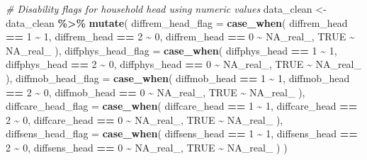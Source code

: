 \documentclass[
]{article}
\newenvironment{Shaded}{\begin{snugshade}}{\end{snugshade}}
\newcommand{\AttributeTok}[1]{\textcolor[rgb]{0.13,0.29,0.53}{#1}}
\newcommand{\CommentTok}[1]{\textcolor[rgb]{0.56,0.35,0.01}{\textit{#1}}}
\newcommand{\ConstantTok}[1]{\textcolor[rgb]{0.56,0.35,0.01}{#1}}
\newcommand{\DecValTok}[1]{\textcolor[rgb]{0.00,0.00,0.81}{#1}}
\newcommand{\FunctionTok}[1]{\textcolor[rgb]{0.13,0.29,0.53}{\textbf{#1}}}
\newcommand{\NormalTok}[1]{#1}
\newcommand{\OtherTok}[1]{\textcolor[rgb]{0.56,0.35,0.01}{#1}}
\newcommand{\SpecialCharTok}[1]{\textcolor[rgb]{0.81,0.36,0.00}{\textbf{#1}}}
\begin{document}
\begin{Shaded}
\begin{Highlighting}[]
\CommentTok{\# Disability flags for household head using numeric values}
\NormalTok{data\_clean }\OtherTok{\textless{}{-}}\NormalTok{ data\_clean }\SpecialCharTok{\%\textgreater{}\%}
  \FunctionTok{mutate}\NormalTok{(}
    \AttributeTok{diffrem\_head\_flag =} \FunctionTok{case\_when}\NormalTok{(}
\NormalTok{      diffrem\_head }\SpecialCharTok{==} \DecValTok{1} \SpecialCharTok{\textasciitilde{}} \DecValTok{1}\NormalTok{,}
\NormalTok{      diffrem\_head }\SpecialCharTok{==} \DecValTok{2} \SpecialCharTok{\textasciitilde{}} \DecValTok{0}\NormalTok{,}
\NormalTok{      diffrem\_head }\SpecialCharTok{==} \DecValTok{0} \SpecialCharTok{\textasciitilde{}} \ConstantTok{NA\_real\_}\NormalTok{,}
      \ConstantTok{TRUE} \SpecialCharTok{\textasciitilde{}} \ConstantTok{NA\_real\_}
\NormalTok{    ),}
    \AttributeTok{diffphys\_head\_flag =} \FunctionTok{case\_when}\NormalTok{(}
\NormalTok{      diffphys\_head }\SpecialCharTok{==} \DecValTok{1} \SpecialCharTok{\textasciitilde{}} \DecValTok{1}\NormalTok{,}
\NormalTok{      diffphys\_head }\SpecialCharTok{==} \DecValTok{2} \SpecialCharTok{\textasciitilde{}} \DecValTok{0}\NormalTok{,}
\NormalTok{      diffphys\_head }\SpecialCharTok{==} \DecValTok{0} \SpecialCharTok{\textasciitilde{}} \ConstantTok{NA\_real\_}\NormalTok{,}
      \ConstantTok{TRUE} \SpecialCharTok{\textasciitilde{}} \ConstantTok{NA\_real\_}
\NormalTok{    ),}
    \AttributeTok{diffmob\_head\_flag =} \FunctionTok{case\_when}\NormalTok{(}
\NormalTok{      diffmob\_head }\SpecialCharTok{==} \DecValTok{1} \SpecialCharTok{\textasciitilde{}} \DecValTok{1}\NormalTok{,}
\NormalTok{      diffmob\_head }\SpecialCharTok{==} \DecValTok{2} \SpecialCharTok{\textasciitilde{}} \DecValTok{0}\NormalTok{,}
\NormalTok{      diffmob\_head }\SpecialCharTok{==} \DecValTok{0} \SpecialCharTok{\textasciitilde{}} \ConstantTok{NA\_real\_}\NormalTok{,}
      \ConstantTok{TRUE} \SpecialCharTok{\textasciitilde{}} \ConstantTok{NA\_real\_}
\NormalTok{    ),}
    \AttributeTok{diffcare\_head\_flag =} \FunctionTok{case\_when}\NormalTok{(}
\NormalTok{      diffcare\_head }\SpecialCharTok{==} \DecValTok{1} \SpecialCharTok{\textasciitilde{}} \DecValTok{1}\NormalTok{,}
\NormalTok{      diffcare\_head }\SpecialCharTok{==} \DecValTok{2} \SpecialCharTok{\textasciitilde{}} \DecValTok{0}\NormalTok{,}
\NormalTok{      diffcare\_head }\SpecialCharTok{==} \DecValTok{0} \SpecialCharTok{\textasciitilde{}} \ConstantTok{NA\_real\_}\NormalTok{,}
      \ConstantTok{TRUE} \SpecialCharTok{\textasciitilde{}} \ConstantTok{NA\_real\_}
\NormalTok{    ),}
    \AttributeTok{diffsens\_head\_flag =} \FunctionTok{case\_when}\NormalTok{(}
\NormalTok{      diffsens\_head }\SpecialCharTok{==} \DecValTok{1} \SpecialCharTok{\textasciitilde{}} \DecValTok{1}\NormalTok{,}
\NormalTok{      diffsens\_head }\SpecialCharTok{==} \DecValTok{2} \SpecialCharTok{\textasciitilde{}} \DecValTok{0}\NormalTok{,}
\NormalTok{      diffsens\_head }\SpecialCharTok{==} \DecValTok{0} \SpecialCharTok{\textasciitilde{}} \ConstantTok{NA\_real\_}\NormalTok{,}
      \ConstantTok{TRUE} \SpecialCharTok{\textasciitilde{}} \ConstantTok{NA\_real\_}
\NormalTok{    )}
\NormalTok{  )}


\end{Highlighting}
\end{Shaded}
\end{document}
